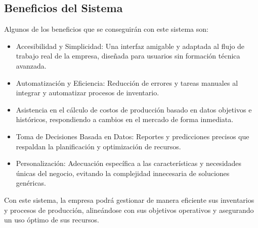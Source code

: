 \subsection{Beneficios del Sistema}

Algunos de los beneficios que se conseguirán con este sistema son:

\begin{itemize}
\item Accesibilidad y Simplicidad: Una interfaz amigable y adaptada al flujo de trabajo real de la empresa, diseñada para usuarios sin formación técnica avanzada.

\item Automatización y Eficiencia: Reducción de errores y tareas manuales al integrar y automatizar procesos de inventario.

\item Asistencia en el cálculo de costos de producción basado en datos objetivos e históricos, respondiendo a cambios en el mercado de forma inmediata.

\item Toma de Decisiones Basada en Datos: Reportes y predicciones precisos que respaldan la planificación y optimización de recursos.

\item Personalización: Adecuación específica a las características y necesidades únicas del negocio, evitando la complejidad innecesaria de soluciones genéricas.
\end{itemize}

Con este sistema, la empresa podrá gestionar de manera eficiente sus inventarios y procesos de producción, alineándose con sus objetivos operativos y asegurando un uso óptimo de sus recursos.

